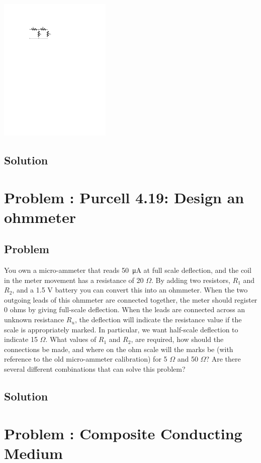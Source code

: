 \documentclass[solutions]{esg8022pset}
\begin{document}
  \begin{center}\includegraphics[width=0.4\textwidth]{ps06_05_01.pdf}\end{center}
\subsection{Solution}

\section{Problem \thesection: Purcell 4.19: Design an ohmmeter}
\subsection{Problem}
  You own a micro-ammeter that reads \SI{50}{\micro\ampere} at full scale deflection, and the coil in the meter movement has a resistance of 20 $\Omega$. By adding two resistors, $R_1$ and $R_2$, and a 1.5 V battery you can convert this into an ohmmeter. When the two outgoing leads of this ohmmeter are connected together, the meter should register 0 ohms by giving full-scale deflection. When the leads are connected across an unknown resistance $R_u$, the deflection will indicate the resistance value if the scale is appropriately marked. In particular, we want half-scale deflection to indicate 15 $\Omega$. What values of $R_1$ and $R_2$, are required, how should the connections be made, and where on the ohm scale will the marks be (with reference to the old micro-ammeter calibration) for 5 $\Omega$ and 50 $\Omega$? Are there several different combinations that can solve this problem?
\subsection{Solution}

\section{Problem \thesection: Composite Conducting Medium}
\end{document}
